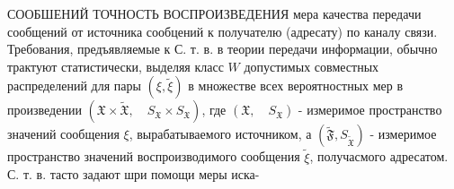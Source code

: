 \documentclass[10pt]{article}
\begin{document}
СООБШЕНИЙ ТОЧНОСТЬ ВОСПРОИЗВЕДЕНИЯ мера качества передачи сообщений от источника сообцений к получателю (адресату) по каналу связи. Требования, предъявляемые к С. т. в. в теории передачи информации, обычно трактуют статистически, выделяя класс $W$ допустимых совместных распределений для пары $(\xi, \tilde{\xi})$ в множестве всех вероятностных мер в произведении $\left(\mathfrak{X} \times \tilde{\mathfrak{X}}, \quad S_{\mathfrak{X}} \times S_{\mathfrak{X}}\right)$, где $\left(\mathfrak{X}, \quad S_{\mathfrak{X}}\right)$ - измеримое пространство значений сообщения $\xi$, вырабатываемого источником, а $\left(\tilde{\mathfrak{F}}, S_{\tilde{\mathfrak{X}}}\right)$ - измеримое пространство значений воспроизводимого сообщения $\tilde{\xi}$, получасмого адресатом. С. т. в. тасто задают шри помощи меры иска-
\end{document}
